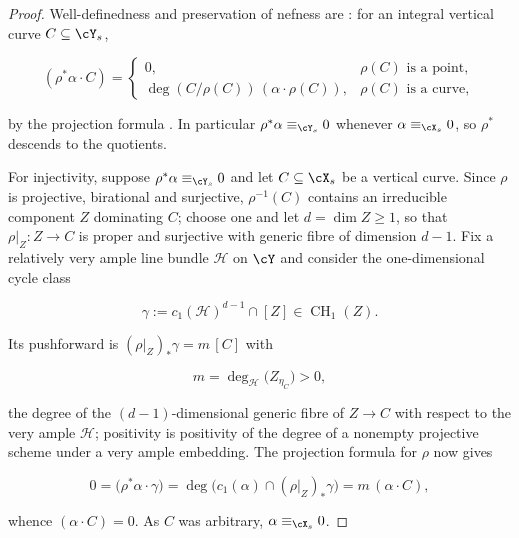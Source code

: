 \begin{proof}
Well-definedness and preservation of nefness are
: for an integral vertical curve
$C\subseteq\cY_s$,

\begin{equation}
\label{eq:ch20-nef-pullback-test}
 (\rho^*\alpha\cdot C)=
 \begin{cases}
  0,&\rho(C)\text{ is a point},\\
  \deg(C/\rho(C))\,(\alpha\cdot\rho(C)),
       &\rho(C)\text{ is a curve},
 \end{cases}
\end{equation}

by the projection formula .  In
particular $\rho^*\alpha\equiv_{\cY_s}0$ whenever
$\alpha\equiv_{\cX_s}0$, so $\rho^*$ descends to the quotients.

For injectivity, suppose $\rho^*\alpha\equiv_{\cY_s}0$ and let
$C\subseteq\cX_s$ be a vertical curve.  Since $\rho$ is projective,
birational and surjective, $\rho^{-1}(C)$ contains an irreducible
component $Z$ dominating $C$; choose one and let $d=\dim Z\ge1$, so
that $\rho|_Z:Z\to C$ is proper and surjective with generic fibre of
dimension $d-1$.  Fix a relatively very ample line bundle $\mathcal H$
on $\cY$ and consider the one-dimensional cycle class

\[
 \gamma:=c_1(\mathcal H)^{d-1}\cap[Z]\in\operatorname{CH}_1(Z).
\]

Its pushforward is $(\rho|_Z)_*\gamma=m\,[C]$ with

\begin{equation}
\label{eq:ch20-injectivity-cycle}
 m=\deg_{\mathcal H}\bigl(Z_{\eta_C}\bigr)>0,
\end{equation}

the degree of the $(d-1)$-dimensional generic fibre of $Z\to C$ with
respect to the very ample $\mathcal H$; positivity is
positivity of the degree of a nonempty projective scheme under a very ample
embedding.  The projection formula for $\rho$ now gives

\[
 0=\bigl(\rho^*\alpha\cdot\gamma\bigr)
  =\deg\bigl(c_1(\alpha)\cap(\rho|_Z)_*\gamma\bigr)
  =m\,(\alpha\cdot C),
\]

whence $(\alpha\cdot C)=0$.  As $C$ was arbitrary,
$\alpha\equiv_{\cX_s}0$.
\end{proof}

